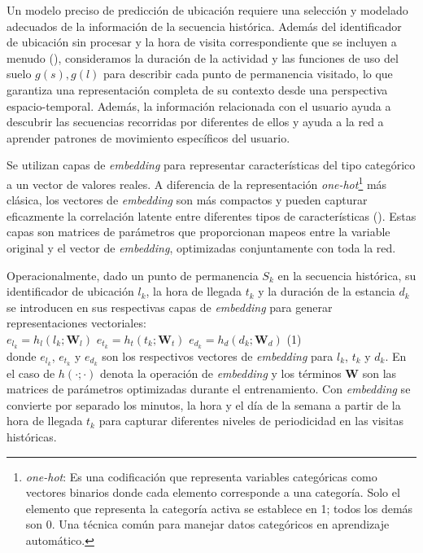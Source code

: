 Un modelo preciso de predicción de ubicación requiere una selección 
y modelado adecuados de la información de la secuencia histórica. 
Además del identificador de ubicación sin procesar y la hora de 
visita correspondiente que se incluyen a menudo (\cite{li2020hierarchical}), 
consideramos la duración de la actividad y las funciones de uso del 
suelo $g(s),g(l)$ para describir cada punto de permanencia visitado, lo que 
garantiza una representación completa de su contexto desde una 
perspectiva espacio-temporal. Además, la información relacionada 
con el usuario ayuda a descubrir las secuencias recorridas por 
diferentes de ellos y ayuda a la red a aprender patrones de 
movimiento específicos del usuario.

Se utilizan capas de \textit{embedding} para representar características 
del tipo categórico a un vector de valores reales. A diferencia de la 
representación \textit{one-hot}\footnote{\textit{one-hot}: Es una codificación que 
representa variables categóricas como vectores binarios donde cada 
elemento corresponde a una categoría. Solo el elemento que 
representa la categoría activa se establece en 1; todos los demás 
son 0. Una técnica común para manejar datos categóricos en 
aprendizaje automático.}
más clásica, los vectores de \textit{embedding} 
son más compactos y pueden capturar eficazmente la correlación 
latente entre diferentes tipos de características (\cite{xu2022understanding}). 
Estas capas son matrices de parámetros que proporcionan mapeos 
entre la variable original y el vector de \textit{embedding}, optimizadas 
conjuntamente con toda la red.

Operacionalmente, dado un punto de permanencia \(S_k\) en la 
secuencia histórica, su identificador de ubicación \(l_k\), 
la hora de llegada \(t_k\) y la duración de la estancia \(d_k\) 
se introducen en sus respectivas capas de \textit{embedding} para 
generar representaciones vectoriales:\\

\(e_{l_k} = h_l(l_k; \mathbf{W}_l)\)
\(e_{t_k} = h_t(t_k; \mathbf{W}_t)\)
\(e_{d_k} = h_d(d_k; \mathbf{W}_d)\) (1)\\

donde \(e_{l_k}\), \(e_{t_k}\) y \(e_{d_k}\) son los respectivos 
vectores de \textit{embedding} para \(l_k\), \(t_k\) y \(d_k\). 
En el caso de \(h(\cdot; \cdot)\) 
denota la operación de \textit{embedding} y los términos 
\(\mathbf{W}\) son las matrices de parámetros optimizadas 
durante el entrenamiento. Con \textit{embedding} se convierte por separado los minutos, 
la hora y el día de la semana a partir de la hora de llegada 
\(t_k\) para capturar diferentes niveles de periodicidad en 
las visitas históricas.\\

